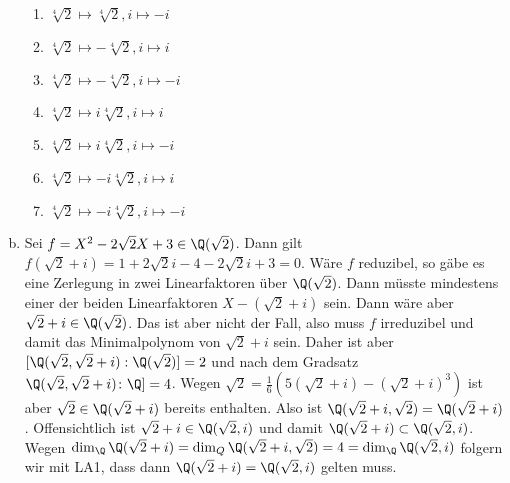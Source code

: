 \documentclass{article}
\begin{document}
\begin{enumerate}[(a)]
\begin{enumerate}[1.]
            \item $\sqrt[4]{2} \mapsto \sqrt[4]{2}, i \mapsto -i$
            \item $\sqrt[4]{2} \mapsto -\sqrt[4]{2}, i \mapsto i$
            \item $\sqrt[4]{2} \mapsto -\sqrt[4]{2}, i \mapsto -i$
            \item $\sqrt[4]{2} \mapsto i\sqrt[4]{2}, i \mapsto i$
            \item $\sqrt[4]{2} \mapsto i\sqrt[4]{2}, i \mapsto -i$
            \item $\sqrt[4]{2} \mapsto -i\sqrt[4]{2}, i \mapsto i$
            \item $\sqrt[4]{2} \mapsto -i\sqrt[4]{2}, i \mapsto -i$
        \end{enumerate}
        \item Sei $f = X^2 - 2\sqrt{2}X + 3 \in \Q(\sqrt{2})$. Dann gilt $f(\sqrt{2} +i) = 1 + 2\sqrt{2}i - 4 - 2\sqrt{2}i + 3 = 0$. Wäre $f$ reduzibel, so gäbe es eine Zerlegung in zwei Linearfaktoren über $\Q(\sqrt{2})$. Dann müsste mindestens einer der beiden Linearfaktoren $X - (\sqrt{2} + i)$ sein. Dann wäre aber $\sqrt{2} + i \in \Q(\sqrt{2})$. Das ist aber nicht der Fall, also muss $f$ irreduzibel und damit das Minimalpolynom von $\sqrt{2} + i$ sein. Daher ist aber $[\Q(\sqrt{2}, \sqrt{2} + i): \Q(\sqrt{2})] = 2$ und nach dem Gradsatz $\Q(\sqrt{2}, \sqrt{2} + i)\colon \Q] = 4$. Wegen $\sqrt{2} = \frac{1}{6}(5(\sqrt{2} + i) - (\sqrt{2} + i)^3)$ ist aber $\sqrt{2} \in \Q(\sqrt{2} + i)$ bereits enthalten. Also ist $\Q(\sqrt{2} + i, \sqrt{2}) = \Q(\sqrt{2} + i)$.
        Offensichtlich ist $\sqrt{2} + i \in \Q(\sqrt{2}, i)$ und damit $\Q(\sqrt{2} + i) \subset \Q(\sqrt{2},i)$. Wegen $\dim_\Q \Q(\sqrt{2} + i) = \dim_Q \Q(\sqrt{2} + i, \sqrt{2}) = 4 = \dim_\Q \Q(\sqrt{2}, i)$ folgern wir mit LA1, dass dann $\Q(\sqrt{2} + i) = \Q(\sqrt{2}, i)$ gelten muss.
    \end{enumerate}
\end{document}

